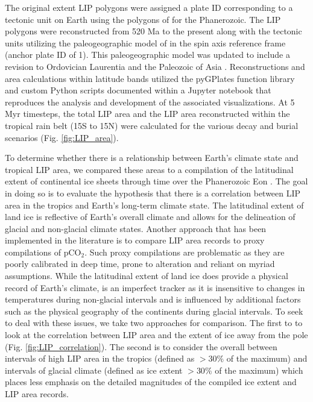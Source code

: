 \documentclass[11pt,letterpaper]{article}
\begin{document}
The original extent LIP polygons were assigned a plate ID corresponding to a tectonic unit on Earth using the polygons of \cite{Torsvik2016a} for the Phanerozoic. The LIP polygons were reconstructed from 520 Ma to the present along with the tectonic units utilizing the paleogeographic model of \cite{Torsvik2016a} in the spin axis reference frame (anchor plate ID of 1). This paleogeographic model was updated to include a revision to Ordovician Laurentia \citep{Swanson-Hysell2017a} and the Paleozoic of Asia \citep{Domeier2018a}. Reconstructions and area calculations within latitude bands utilized the pyGPlates function library and custom Python scripts documented within a Jupyter notebook that reproduces the analysis and development of the associated visualizations. At 5 Myr timesteps, the total LIP area and the LIP area reconstructed within the tropical rain belt (15\textdegree S to 15\textdegree N) were calculated for the various decay and burial scenarios (Fig. \ref{fig:LIP_area}). 

To determine whether there is a relationship between Earth's climate state and tropical LIP area, we compared these areas to a compilation of the latitudinal extent of continental ice sheets through time over the Phanerozoic Eon \fig{}. The goal in doing so is to evaluate the hypothesis that there is a correlation between LIP area in the tropics and Earth's long-term climate state. The latitudinal extent of land ice is reflective of Earth's overall climate and allows for the delineation of glacial and non-glacial climate states. Another approach that has been implemented in the literature is to compare LIP area records to proxy compilations of pCO$_2$. Such proxy compilations are problematic as they are poorly calibrated in deep time, prone to alteration and reliant on myriad assumptions. While the latitudinal extent of land ice does provide a physical record of Earth's climate, is an imperfect tracker as it is insensitive to changes in temperatures during non-glacial intervals and is influenced by additional factors such as the physical geography of the continents during glacial intervals. To seek to deal with these issues, we take two approaches for comparison. The first to to look at the correlation between LIP area and the extent of ice away from the pole (Fig. \ref{fig:LIP_correlation}). The second is to consider the overall between intervals of high LIP area in the tropics (defined as $>30\%$ of the maximum) and intervals of glacial climate (defined as ice extent $>30\%$ of the maximum) which places less emphasis on the detailed magnitudes of the compiled ice extent and LIP area records. 
\end{document}

